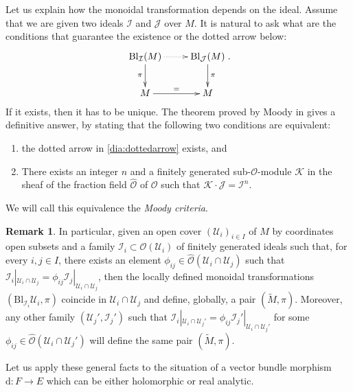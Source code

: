 \documentclass[10pt]{article}
\theoremstyle{plain}
\theoremstyle{definition}
\newtheorem{remark}[lemma]{Remark}
\theoremstyle{remark}
\newcommand{\dd}{\mathrm{d}}
\begin{document}
\vspace{0.5cm}
Let us explain how the monoidal transformation depends on the ideal. Assume that we are given two ideals  $ \mathcal I$ and $ \mathcal J$ over $M$. It is natural to ask what are the conditions that guarantee the existence or the dotted arrow below:
 \begin{equation}\label{dia:dottedarrow}  \xymatrix{  \mathrm{Bl}_{\mathcal I}(M) \ar@{.>}[r]\ar[d]_\pi&\ar[d]^\pi \mathrm{Bl}_{\mathcal J}(M)\\ M \ar[r]^{=}& M } .  \end{equation}
 If it exists, then it has to be  unique. 
The theorem proved by Moody in \cite{Moody} gives a definitive answer,  by stating that the following two conditions are equivalent:
 \begin{enumerate}
 \item[(i)] the dotted arrow in \eqref{dia:dottedarrow} exists, and
 \item[(ii)] There exists an integer $n$ and a finitely generated sub-$\mathcal O$-module $\mathcal K $ in the sheaf of the fraction field $\hat{\mathcal O }$ of $ \mathcal O$ such that $   \mathcal K \cdot \mathcal J =\mathcal I^n $.
 \end{enumerate}
We will call this equivalence the \emph{Moody criteria}.
 
\begin{remark}
\label{rmk:glueing}
In particular, given an open cover $(\mathcal U_i)_{i \in I} $ of $M$ by coordinates open subsets and a family $ \mathcal I_i \subset \mathcal O(\mathcal U_i)$ of finitely generated ideals such that, for every $ i,j \in I$, there exists an element $\phi_{ij} \in \hat{\mathcal O}(\mathcal U_i\cap \mathcal U_j) $ such that $ \mathcal I_i|_{\mathcal U_i\cap\mathcal U_j}  = \phi_{ij} \mathcal I_j|_{\mathcal U_i\cap \mathcal U_j} $, then the locally defined monoidal transformations $({\mathrm{Bl}}_{\mathcal I_i}\mathcal U_i , \pi) $ coincide in $ \mathcal U_i \cap \mathcal U_j$ and define, globally, a pair $( \tilde{M},\pi) $. Moreover, any other family $ (\mathcal U_j',\mathcal I_j')$ such that $ \mathcal I_i|_{\mathcal U_i\cap \mathcal U_j'}  = \phi_{ij} \mathcal I_j'|_{\mathcal U_i\cap\mathcal U_j'} $ for some $ \phi_{ij} \in \hat {\mathcal O}(\mathcal U_i \cap \mathcal U_j')$ will define the same pair $ (\tilde{M},\pi)$.
\end{remark}

\vspace{0.5cm}
Let us apply these general facts to the situation of a vector bundle morphism $\dd\colon F\to E$ which can be either holomorphic or real analytic.
\end{document}
